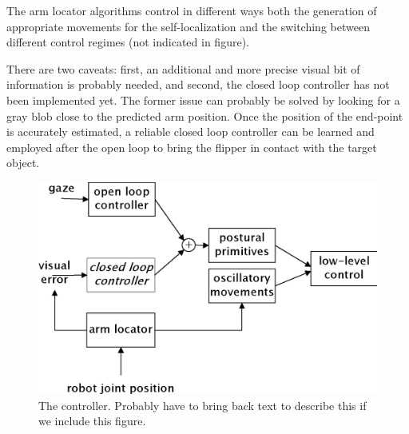 The arm locator algorithms control in different ways both the
generation of appropriate movements for the self-localization and the
switching between different control regimes (not indicated in figure).

There are two caveats: first, an additional and more precise visual
bit of information is probably needed, and second, the closed loop
controller has not been implemented yet. The former issue can probably
be solved by looking for a gray blob close to the predicted arm
position. Once the position of the end-point is accurately estimated,
a reliable closed loop controller can be learned and employed after the
open loop to bring the flipper in contact with the target object.
\fi

\ifverbose
\begin{figure}[tbh]
\begin{center}
\includegraphics[width=\columnwidth]{control-flow.eps}
\caption{ 
\label{fig:control-flow}
%
  The controller.  Probably have to bring back text to describe this
  if we include this figure.
%
}
\end{center}
\end{figure}
\fi

